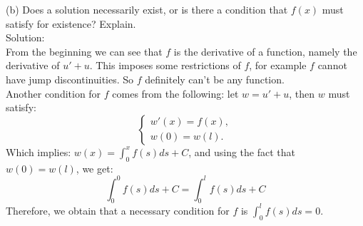 \documentclass[12pt]{article}%
\begin{document}
\begin{enumerate}
\begin{enumerate}
       (b) Does a solution necessarily exist, or is there a condition that $f(x)$ must satisfy for existence? Explain.\\
      Solution:\\
      From the beginning we can see that $f$ is the derivative of a function,
      namely the derivative of $u'+u$. This imposes some restrictions of $f$,
      for example $f$ cannot have jump discontinuities. So $f$ definitely can't be any function.\\
      Another condition for $f$ comes from the following: let $w=u'+u$, then
      $w$ must satisfy:
      \begin{equation*}
       \begin{cases}
           w'(x)=f(x),
           \\
           w(0)=w(l).
       \end{cases}
      \end{equation*}
      Which implies: $w(x)=\int_0^x f(s)ds +C$, and using the fact that
      $w(0)=w(l)$, we get:
      \[\int_0^0 f(s)ds+C=\int_0^l f(s)ds+C\]
Therefore, we obtain that a necessary condition for $f$ is $\int_{0}^{l}f(s)ds=0$.


\end{enumerate}
\end{enumerate}
\end{document}
